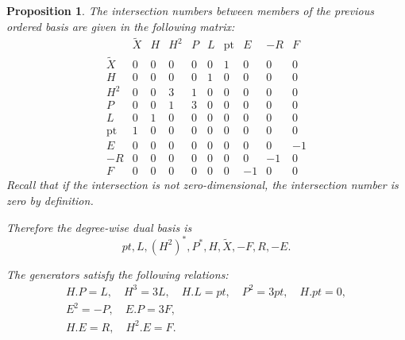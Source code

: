 \documentclass[11pt]{amsart}
\theoremstyle{plain}
\newtheorem{proposition}[theorem]{Proposition}
\numberwithin{equation}{section}
\theoremstyle{definition}
\theoremstyle{remark}
\begin{document}
\begin{proposition}\label{pIntersectionMatrix}
The intersection numbers between members of the previous ordered basis are given in the following matrix: 
\[
\renewcommand{\arraystretch}{1.2}
\begin{array}{c|cccccc|ccc}
      & \widetilde{X} & H & H^2 & P & L & \mathrm{pt} & E & -R & F \\ \hline
\widetilde{X} & 0 & 0 & 0 & 0 & 0 & 1 & 0 & 0 & 0 \\
H             & 0 & 0 & 0 & 0 & 1 & 0 & 0 & 0 & 0 \\
H^2           & 0 & 0 & 3 & 1 & 0 & 0 & 0 & 0 & 0 \\
P             & 0 & 0 & 1 & 3 & 0 & 0 & 0 & 0 & 0 \\
L             & 0 & 1 & 0 & 0 & 0 & 0 & 0 & 0 & 0 \\
\mathrm{pt}   & 1 & 0 & 0 & 0 & 0 & 0 & 0 & 0 & 0 \\ \hline
E             & 0 & 0 & 0 & 0 & 0 & 0 & 0 & 0 & -1 \\
-R            & 0 & 0 & 0 & 0 & 0 & 0 & 0 & -1 & 0 \\
F             & 0 & 0 & 0 & 0 & 0 & 0 & -1 & 0 & 0
\end{array}
\]
Recall that if the intersection is not zero-dimensional,  the intersection number is zero by definition. 

Therefore the degree-wise dual basis is 
\[
pt, L, (H^2)^*, P^*, H, \widetilde{X}, -F, R, -E .
\]

The generators satisfy the following relations:
\begin{gather*}
H.P = L , \quad 
H^3  = 3L , \quad 
H.L  = pt , \quad
P^2  = 3 pt, \quad
H. pt = 0, \\
E^2  = -P , \quad
E.P  = 3F , \\
H.E  = R , \quad
H^2. E  = F. 
\end{gather*}
\end{proposition}
\end{document}
